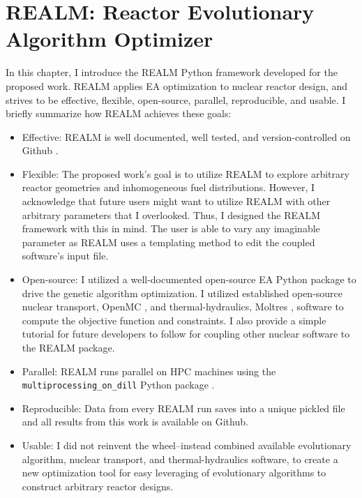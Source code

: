 \chapter{REALM: Reactor Evolutionary Algorithm Optimizer}

In this chapter, I introduce the \gls{REALM} Python framework developed for the
proposed work.
\gls{REALM} applies \gls{EA} optimization to nuclear reactor design, and 
strives to be effective, flexible, open-source, parallel, reproducible, 
and usable. 
I briefly summarize how \gls{REALM} achieves these goals:  
\begin{itemize}
    \item Effective: \gls{REALM} is well documented, well tested, and 
    version-controlled on Github \cite{chee_arfcrealm_2021}.
    \item Flexible: The proposed work's goal is to utilize \gls{REALM} to 
    explore arbitrary reactor geometries and inhomogeneous fuel distributions. 
    However, I acknowledge that future users might want to utilize \gls{REALM} 
    with other arbitrary parameters that I overlooked. Thus, I designed the \gls{REALM}
    framework with this in mind. The user is able to vary any imaginable parameter 
    as \gls{REALM} uses a templating method to edit the coupled software's input 
    file.
    \item Open-source: I utilized a well-documented open-source \gls{EA} Python 
    package to drive the genetic algorithm optimization. I utilized established 
    open-source nuclear transport, OpenMC \cite{romano_openmc_2013}, and 
    thermal-hydraulics, Moltres \cite{lindsay_introduction_2018}, software to 
    compute the objective function and constraints. I also provide a simple 
    tutorial for future developers to follow for coupling other nuclear software 
    to the \gls{REALM} package.  
    \item Parallel: \gls{REALM} runs parallel on \gls{HPC} machines using the 
    \texttt{multiprocessing\_on\_dill} Python package 
    \cite{smallshire_multiprocessing_on_dill_nodate}.
    \item Reproducible: Data from every REALM run saves into a unique pickled file
    and all results from this work is available on Github. 
    \item Usable: I did not reinvent the wheel--instead combined available 
    evolutionary algorithm, nuclear transport, and thermal-hydraulics software, 
    to create a new optimization tool for easy leveraging of evolutionary algorithms 
    to construct arbitrary reactor designs. 
\end{itemize}

